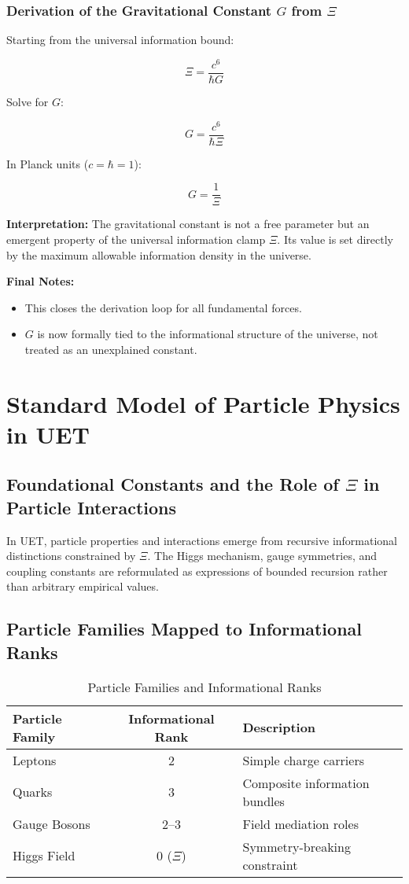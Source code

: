 \documentclass[12pt,a4paper]{article}
\begin{document}
\subsubsection{Derivation of the Gravitational Constant \(G\) from \(\Xi\)}

Starting from the universal information bound:

\[
\Xi = \frac{c^6}{\hbar G}
\]

Solve for \(G\):

\[
G = \frac{c^6}{\hbar \Xi}
\]

In Planck units (\(c = \hbar = 1\)):

\[
G = \frac{1}{\Xi}
\]

\textbf{Interpretation:}  
The gravitational constant is not a free parameter but an emergent property of the universal information clamp \(\Xi\). Its value is set directly by the maximum allowable information density in the universe.

\bigskip

\textbf{Final Notes:}
\begin{itemize}
    \item This closes the derivation loop for all fundamental forces.
    \item \(G\) is now formally tied to the informational structure of the universe, not treated as an unexplained constant.
\end{itemize}
\section{Standard Model of Particle Physics in UET}

\subsection{Foundational Constants and the Role of \(\Xi\) in Particle Interactions}

In UET, particle properties and interactions emerge from recursive informational distinctions constrained by \(\Xi\). The Higgs mechanism, gauge symmetries, and coupling constants are reformulated as expressions of bounded recursion rather than arbitrary empirical values.

\subsection{Particle Families Mapped to Informational Ranks}

\begin{table}[h]
\centering
\begin{tabular}{|l|c|l|}
\hline
\textbf{Particle Family} & \textbf{Informational Rank} & \textbf{Description} \\
\hline
Leptons & 2 & Simple charge carriers \\
Quarks & 3 & Composite information bundles \\
Gauge Bosons & 2--3 & Field mediation roles \\
Higgs Field & 0 (\(\Xi\)) & Symmetry-breaking constraint \\
\hline
\end{tabular}
\caption{Particle Families and Informational Ranks}
\end{table}
\end{document}
